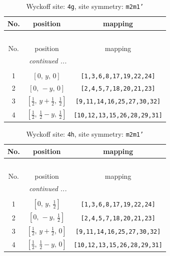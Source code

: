 \documentclass[fleqn,8pt]{jsarticle}
\begin{document}
\renewcommand{\arraystretch}{1.2}
\begin{longtable}{ccc}
\caption{Wyckoff site: {\tt 4g}, site symmetry: {\tt m2m1'}}
 \\
 \hline \hline
No. & position & mapping \\ \hline \endfirsthead

\multicolumn{2}{l}{\tablename\ \thetable{}} \\
 \hline \hline
No. & position & mapping \\ \hline \endhead

 \hline \hline
\multicolumn{2}{r}{\footnotesize\it continued ...} \\ \endfoot

 \hline \hline
\multicolumn{2}{r}{} \\ \endlastfoot

1 & $\left[ 0,\, y,\, 0 \right]$ & {\tt [1,3,6,8,17,19,22,24]} \\ \hline
2 & $\left[ 0,\, - y,\, 0 \right]$ & {\tt [2,4,5,7,18,20,21,23]} \\ \hline
3 & $\left[ \frac{1}{2},\, y + \frac{1}{2},\, \frac{1}{2} \right]$ & {\tt [9,11,14,16,25,27,30,32]} \\ \hline
4 & $\left[ \frac{1}{2},\, \frac{1}{2} - y,\, \frac{1}{2} \right]$ & {\tt [10,12,13,15,26,28,29,31]} \\
\end{longtable}
\renewcommand{\arraystretch}{1.2}
\begin{longtable}{ccc}
\caption{Wyckoff site: {\tt 4h}, site symmetry: {\tt m2m1'}}
 \\
 \hline \hline
No. & position & mapping \\ \hline \endfirsthead

\multicolumn{2}{l}{\tablename\ \thetable{}} \\
 \hline \hline
No. & position & mapping \\ \hline \endhead

 \hline \hline
\multicolumn{2}{r}{\footnotesize\it continued ...} \\ \endfoot

 \hline \hline
\multicolumn{2}{r}{} \\ \endlastfoot

1 & $\left[ 0,\, y,\, \frac{1}{2} \right]$ & {\tt [1,3,6,8,17,19,22,24]} \\ \hline
2 & $\left[ 0,\, - y,\, \frac{1}{2} \right]$ & {\tt [2,4,5,7,18,20,21,23]} \\ \hline
3 & $\left[ \frac{1}{2},\, y + \frac{1}{2},\, 0 \right]$ & {\tt [9,11,14,16,25,27,30,32]} \\ \hline
4 & $\left[ \frac{1}{2},\, \frac{1}{2} - y,\, 0 \right]$ & {\tt [10,12,13,15,26,28,29,31]} \\
\end{longtable}
\end{document}

